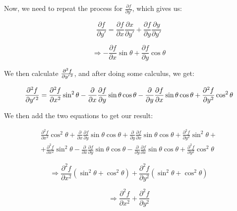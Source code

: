 \documentclass{article}
\begin{document}
\begin{enumerate}
Now, we need to repeat the process for {\Large$\frac{\partial f}{\partial y'}$}, which gives us:

\begin{equation}
\frac{\partial f}{\partial y'} = \frac{\partial f}{\partial x}\frac{\partial x}{\partial y'} + \frac{\partial f}{\partial y}\frac{\partial y}{\partial y'}
\end{equation}

\begin{equation}
\Rightarrow -\frac{\partial f}{\partial x} \sin\theta + \frac{\partial f}{\partial y}\cos\theta 
\end{equation}

We then calculate {\Large$\frac{\partial^2 f}{\partial y' \hspace{.2mm} ^2}$}, and after doing some calculus, we get:

\begin{equation}
\frac{\partial^2 f}{\partial y' \hspace{.2mm} ^2} = \frac{\partial ^2 f}{\partial x^2} \sin ^2 \theta  -  \frac{\partial}{\partial x} \frac{\partial f}{\partial y} \sin\theta\cos\theta - \frac{\partial}{\partial y} \frac{\partial f}{\partial x} \sin\theta\cos\theta  + \frac{\partial ^2 f}{\partial y^2} \cos ^ 2 \theta
\end{equation}

We then add the two equations to get our result:

\begin{multline}
\frac{\partial ^2 f}{\partial x^2} \cos ^ 2 \theta  + \frac{\partial}{\partial x} \frac{\partial f}{\partial y} \sin\theta\cos\theta + \frac{\partial}{\partial y} \frac{\partial f}{\partial x}\sin\theta\cos\theta  + \frac{\partial ^2 f}{\partial y^2} \sin ^ 2 \theta  + \\ 
+ \frac{\partial ^2 f}{\partial x^2} \sin ^2 \theta   -  \frac{\partial}{\partial x} \frac{\partial f}{\partial y} \sin\theta\cos\theta  - \frac{\partial}{\partial y} \frac{\partial f}{\partial x} \sin\theta\cos\theta  + \frac{\partial ^2 f}{\partial y^2} \cos ^ 2 \theta 
\end{multline}

\begin{equation}
\Rightarrow \frac{\partial ^2 f}{\partial x^2} \left( \sin ^2 \theta + \cos ^2 \theta \right)  + \frac{\partial ^2 f}{\partial y^2} \left( \sin ^2 \theta + \cos ^2 \theta \right) 
\end{equation}

\begin{equation}
\Rightarrow \frac{\partial ^2 f}{\partial x^2} + \frac{\partial ^2 f}{\partial y^2}
\end{equation}


\end{enumerate}
\end{document}
